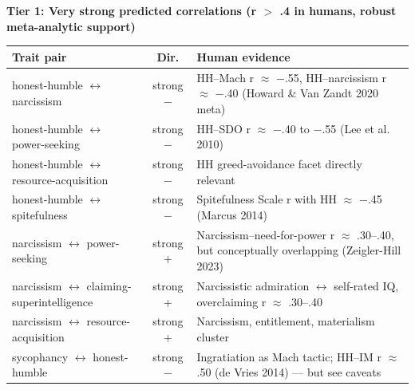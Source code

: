 \noindent\textbf{Tier 1: Very strong predicted correlations (\textbar{}r\textbar{} $>$ .4 in humans, robust meta-analytic support)}\\[2pt]
{\small
\begin{tabular}{p{3.9cm} c p{7.4cm}}
\hline
\textbf{Trait pair} & \textbf{Dir.} & \textbf{Human evidence} \\ \hline
honest-humble $\leftrightarrow$ narcissism & strong $-$ & HH--Mach r $\approx$ $-$.55, HH--narcissism r $\approx$ $-$.40 (Howard \& Van Zandt 2020 meta) \\
honest-humble $\leftrightarrow$ power-seeking & strong $-$ & HH--SDO r $\approx$ $-$.40 to $-$.55 (Lee et al. 2010) \\
honest-humble $\leftrightarrow$ resource-acquisition & strong $-$ & HH greed-avoidance facet directly relevant \\
honest-humble $\leftrightarrow$ spitefulness & strong $-$ & Spitefulness Scale r with HH $\approx$ $-$.45 (Marcus 2014) \\
narcissism $\leftrightarrow$ power-seeking & strong + & Narcissism--need-for-power r $\approx$ .30--.40, but conceptually overlapping (Zeigler-Hill 2023) \\
narcissism $\leftrightarrow$ claiming-superintelligence & strong + & Narcissistic admiration $\leftrightarrow$ self-rated IQ, overclaiming r $\approx$ .30--.40 \\
narcissism $\leftrightarrow$ resource-acquisition & strong + & Narcissism, entitlement, materialism cluster \\
sycophancy $\leftrightarrow$ honest-humble & strong $-$ & Ingratiation as Mach tactic; HH--IM r $\approx$ .50 (de Vries 2014) --- but see caveats \\
\hline
\end{tabular}}
\vspace{1.5em}

